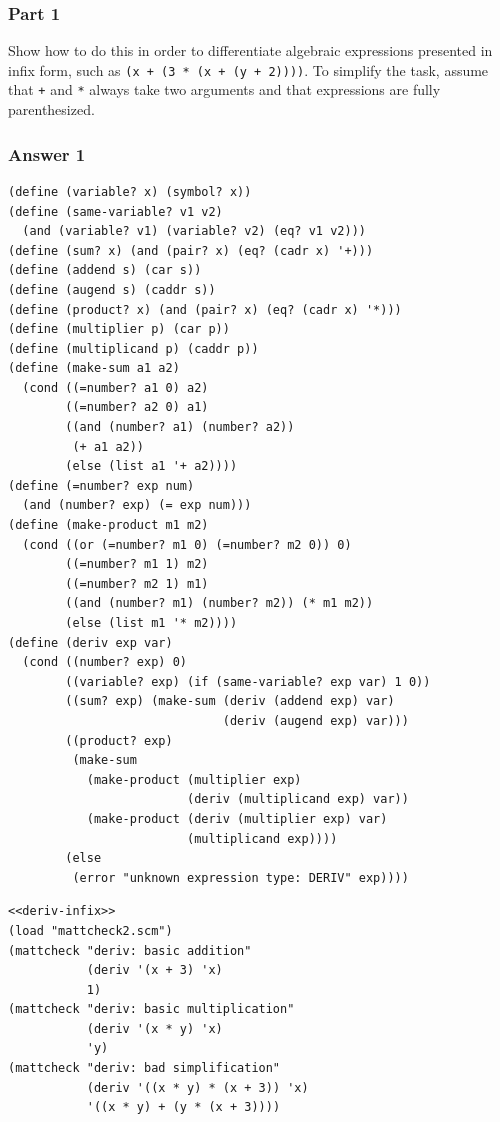 \documentclass[final,fleqn,titlepage,twoside]{article}
\begin{document}
\subsubsection{Part 1}
\label{sec:orgb73ad4c}
Show how to do this in order to differentiate algebraic expressions presented
in infix form, such as \texttt{(x + (3 * (x + (y + 2))))}.  To simplify the task,
assume that \texttt{+} and \texttt{*} always take two arguments and that
expressions are fully parenthesized.

\subsubsection{Answer 1}
\label{sec:org02eac60}
\begin{verbatim}
(define (variable? x) (symbol? x))
(define (same-variable? v1 v2)
  (and (variable? v1) (variable? v2) (eq? v1 v2)))
(define (sum? x) (and (pair? x) (eq? (cadr x) '+)))
(define (addend s) (car s))
(define (augend s) (caddr s))
(define (product? x) (and (pair? x) (eq? (cadr x) '*)))
(define (multiplier p) (car p))
(define (multiplicand p) (caddr p))
(define (make-sum a1 a2)
  (cond ((=number? a1 0) a2)
        ((=number? a2 0) a1)
        ((and (number? a1) (number? a2))
         (+ a1 a2))
        (else (list a1 '+ a2))))
(define (=number? exp num)
  (and (number? exp) (= exp num)))
(define (make-product m1 m2)
  (cond ((or (=number? m1 0) (=number? m2 0)) 0)
        ((=number? m1 1) m2)
        ((=number? m2 1) m1)
        ((and (number? m1) (number? m2)) (* m1 m2))
        (else (list m1 '* m2))))
(define (deriv exp var)
  (cond ((number? exp) 0)
        ((variable? exp) (if (same-variable? exp var) 1 0))
        ((sum? exp) (make-sum (deriv (addend exp) var)
                              (deriv (augend exp) var)))
        ((product? exp)
         (make-sum
           (make-product (multiplier exp)
                         (deriv (multiplicand exp) var))
           (make-product (deriv (multiplier exp) var)
                         (multiplicand exp))))
        (else
         (error "unknown expression type: DERIV" exp))))
\end{verbatim}
\begin{verbatim}
<<deriv-infix>>
(load "mattcheck2.scm")
(mattcheck "deriv: basic addition"
           (deriv '(x + 3) 'x)
           1)
(mattcheck "deriv: basic multiplication"
           (deriv '(x * y) 'x)
           'y)
(mattcheck "deriv: bad simplification"
           (deriv '((x * y) * (x + 3)) 'x)
           '((x * y) + (y * (x + 3))))
\end{verbatim}
\end{document}
